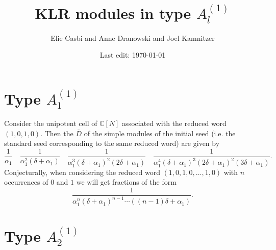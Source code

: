 \documentclass[11pt]{article}
\begin{document}
\theoremstyle{plain}
\newtheorem{deftn}{Definition}[section]
\newtheorem{lem}[deftn]{Lemma}
\newtheorem{prop}[deftn]{Proposition}
\newtheorem{thm}[deftn]{Theorem}
\newtheorem{cor}[deftn]{Corollary}
\newtheorem{conj}[deftn]{Conjecture}
\newtheorem{Question}[deftn]{Question}
\newtheorem{Fact}{Evidence}
\newtheorem{assump}{Assumption}[section]
\renewcommand{\theassump}{\Alph{assump}}
\newtheorem{conjintro}{Conjecture}
\newtheorem{thmintro}{Theorem}

\theoremstyle{definition}
\newtheorem{ex}[deftn]{Example}
\newtheorem{rk}[deftn]{Remark}


\newcommand{\CQ}{\mathcal{C}_Q}
\newcommand{\CZ}{\mathcal{C}_{\mathbb{Z}}}
\newcommand{\Atn}{\mathcal{A}_t (\mathfrak{n})}
\newcommand{\CN}{\mathbb{C}[N]}


\title{KLR modules in type $A_l^{(1)}$}
\author{Elie Casbi and Anne Dranowski and Joel Kamnitzer}
 
\date{Last edit: \today}

\maketitle

\section{Type $A_1^{(1)}$}

Consider the unipotent cell of $\CN$ associated with the reduced word $(1,0,1,0)$. Then the $\bar{D}$ of the simple modules of the  initial seed (i.e. the standard seed corresponding to the same reduced word) are given by 
$$ \frac{1}{\alpha_1} \quad  \frac{1}{\alpha_1^2(\delta + \alpha_1)} \quad  \frac{1}{\alpha_1^3(\delta + \alpha_1)^2(2 \delta + \alpha_1)} \quad \frac{1}{\alpha_1^4(\delta + \alpha_1)^3(2 \delta + \alpha_1)^2(3 \delta + \alpha_1)} . $$ 
Conjecturally, when considering the reduced word $(1,0,1,0, \ldots , 1,0)$ with $n$ occurrences of $0$ and $1$ we will get fractions of the form 
$$  \frac{1}{\alpha_1^n(\delta + \alpha_1)^{n-1} \cdots ((n-1) \delta + \alpha_1)} . $$ 

\section{Type $A_2^{(1)}$}
\end{document}
